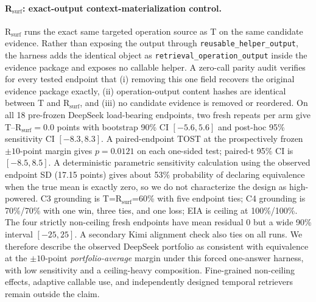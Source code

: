 \paragraph{R$_{\mathrm{surf}}$: exact-output context-materialization control.}
R$_{\mathrm{surf}}$ runs the exact same targeted operation source as T on the same candidate evidence. Rather than exposing the output through \texttt{reusable\_helper\_output}, the harness adds the identical object as \texttt{retrieval\_operation\_output} inside the evidence package and exposes no callable helper. A zero-call parity audit verifies for every tested endpoint that (i) removing this one field recovers the original evidence package exactly, (ii) operation-output content hashes are identical between T and R$_{\mathrm{surf}}$, and (iii) no candidate evidence is removed or reordered. On all 18 pre-frozen DeepSeek load-bearing endpoints, two fresh repeats per arm give T--R$_{\mathrm{surf}}=0.0$ points with bootstrap 90\% CI $[-5.6,5.6]$ and post-hoc 95\% sensitivity CI $[-8.3,8.3]$. A paired-endpoint TOST at the prospectively frozen $\pm10$-point margin gives $p=0.0121$ on each one-sided test; paired-t 95\% CI is $[-8.5,8.5]$. A deterministic parametric sensitivity calculation using the observed endpoint SD (17.15 points) gives about 53\% probability of declaring equivalence when the true mean is exactly zero, so we do not characterize the design as high-powered. C3 grounding is T=R$_{\mathrm{surf}}$=60\% with five endpoint ties; C4 grounding is 70\%/70\% with one win, three ties, and one loss; EIA is ceiling at 100\%/100\%. The four strictly non-ceiling fresh endpoints have mean residual 0 but a wide 90\% interval $[-25,25]$. A secondary Kimi alignment check also ties on all runs. We therefore describe the observed DeepSeek portfolio as consistent with equivalence at the $\pm10$-point \emph{portfolio-average} margin under this forced one-answer harness, with low sensitivity and a ceiling-heavy composition. Fine-grained non-ceiling effects, adaptive callable use, and independently designed temporal retrievers remain outside the claim.

